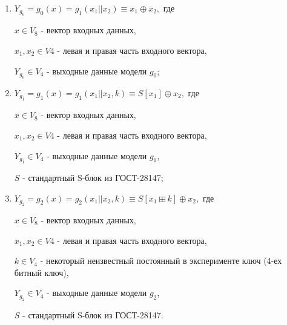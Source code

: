 \documentclass[a4paper,12pt,twoside]{article}
\begin{document}
	\begin{enumerate}
	\item 
	$Y_{g_0} = g_0(x) = g_1(x_1 || x_2)\equiv x_1 \oplus x_2,$ где
	
	$x \in V_{8}$ - вектор входных данных,
	
	$x_1, x_2 \in V{4}$ - левая и правая часть входного вектора,
	
	$Y_{g_0} \in V_{4}$ - выходные данные модели $g_0$;
	\bigskip
		
	\item 
	$Y_{g_1} = g_1(x) = g_1(x_1 || x_2, k) \equiv S[x_1] \oplus x_2,$ где
	
	 $x \in V_{8}$ - вектор входных данных,
	 
	 $x_1, x_2 \in V{4}$ - левая и правая часть входного вектора,
	 
	 
	 $Y_{g_1} \in V_{4}$ - выходные данные модели $g_1$,
	 
	 $S$ - стандартный S-блок из ГОСТ-28147;
	\bigskip
	
	\item 
	$Y_{g_2} = g_2(x) = g_2(x_1 || x_2, k) \equiv S[x_1 \boxplus k] \oplus x_2,$ где
	
	$x \in V_{8}$ - вектор входных данных,
	
	$x_1, x_2 \in V{4}$ - левая и правая часть входного вектора,
	
	$k \in V_{4}$ - некоторый неизвестный постоянный в эксперименте ключ (4-ех битный ключ),
	
	$Y_{g_2} \in V_{4}$ - выходные данные модели $g_2$,
	
	$S$ - стандартный S-блок из ГОСТ-28147.



%
%	
	\end{enumerate}
	
\end{document}
